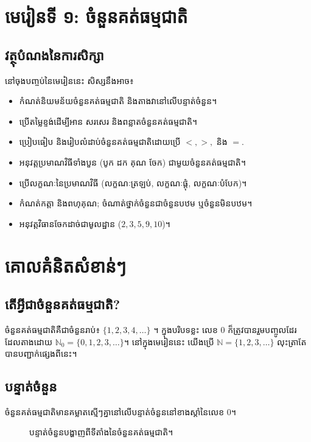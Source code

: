 \section*{\textkhmer{មេរៀនទី ១: ចំនួនគត់ធម្មជាតិ}}\label{sec:textkhmer{--------}}

\subsection*{វត្ថុបំណងនៃការសិក្សា}
    នៅចុងបញ្ចប់នៃមេរៀននេះ សិស្សនឹងអាច៖
    \begin{itemize}[label=-]
        \item កំណត់និយមន័យចំនួនគត់ធម្មជាតិ និងតាងវានៅលើបន្ទាត់ចំនួន។
        \item ប្រើតម្លៃខ្ទង់ដើម្បីអាន សរសេរ និងពន្លាតចំនួនគត់ធម្មជាតិ។
        \item ប្រៀបធៀប និងរៀបលំដាប់ចំនួនគត់ធម្មជាតិដោយប្រើ $<, >,$ និង $=$.
        \item អនុវត្តប្រមាណវិធីទាំងបួន (បូក ដក គុណ ចែក) ជាមួយចំនួនគត់ធម្មជាតិ។
        \item ប្រើលក្ខណៈនៃប្រមាណវិធី (លក្ខណៈត្រឡប់, លក្ខណៈផ្ដុំ, លក្ខណៈបំបែក)។
        \item កំណត់កត្តា និងពហុគុណ; ចំណាត់ថ្នាក់ចំនួនជាចំនួនបឋម ឬចំនួនមិនបឋម។
        \item អនុវត្តវិធានចែកដាច់ជាមូលដ្ឋាន ($2, 3, 5, 9, 10$)។
    \end{itemize}

\section{គោលគំនិតសំខាន់ៗ}
\subsection{តើអ្វីជាចំនួនគត់ធម្មជាតិ?}
ចំនួនគត់ធម្មជាតិគឺជាចំនួនរាប់៖ $\{1,2,3,4,\dots\}$ ។ ក្នុងបរិបទខ្លះ លេខ $0$ ក៏ត្រូវបានរួមបញ្ចូលដែរ ដែលតាងដោយ $\mathbb{N}_0 = \{0, 1, 2, 3, \dots\}$។ នៅក្នុងមេរៀននេះ យើងប្រើ $\mathbb{N}=\{1,2,3,\dots\}$ លុះត្រាតែបានបញ្ជាក់ផ្សេងពីនេះ។

\subsection{បន្ទាត់ចំនួន}
ចំនួនគត់ធម្មជាតិមានគម្លាតស្មើៗគ្នានៅលើបន្ទាត់ចំនួននៅខាងស្ដាំនៃលេខ $0$។
\begin{figure}[h!]
    \centering
    \caption{បន្ទាត់ចំនួនបង្ហាញពីទីតាំងនៃចំនួនគត់ធម្មជាតិ។}
    \label{fig:number-line}
\end{figure}

